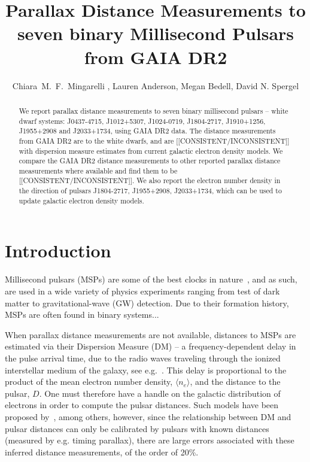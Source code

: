 \documentclass[iop,apj]{emulateapj}
\begin{document}
\title{Parallax Distance Measurements to seven binary Millisecond Pulsars from GAIA DR2}
 
\author{
Chiara~M.~F.~Mingarelli , 
Lauren Anderson,
Megan Bedell,
David N. Spergel
}



\begin{abstract}
We report parallax distance measurements to seven binary millisecond pulsars -- white dwarf systems: J0437-4715, J1012+5307, J1024-0719, J1804-2717, J1910+1256, J1955+2908 and J2033+1734, using GAIA DR2 data. The distance measurements from GAIA DR2 are to the white dwarfs, and are [[CONSISTENT/INCONSISTENT]] with dispersion measure estimates from current galactic electron density models. We compare the GAIA DR2 distance measurements to other reported parallax distance measurements where available and find them to be [[CONSISTENT/INCONSISTENT]]. We also report the electron number density in the direction of pulsars J1804-2717, J1955+2908, J2033+1734, which can be used to update galactic electron density models.
\end{abstract}


\section{Introduction}
\label{sec:intro}
Millisecond pulsars (MSPs) are some of the best clocks in nature~\citep{bkh+82}, and as such, are used in a wide variety of physics experiments ranging from test of dark matter to gravitational-wave (GW) detection. Due to their formation history, MSPs are often found in binary systems...

When parallax distance measurements are not available, distances to MSPs are estimated via their Dispersion Measure (DM) -- a frequency-dependent delay in the pulse arrival time, due to the radio waves traveling through the ionized interstellar medium of the galaxy, see e.g.~\citep{pulsarAstronomy}. This delay is proportional to the product of the mean electron number density, $\langle n_e \rangle$, and the distance to the pulsar, $D$. One must therefore have a handle on the galactic distribution of electrons in order to compute the pulsar distances. Such models have been proposed by~\cite{cl02,cl03, ymw+17}, among others, however, since the relationship between DM and pulsar distances can only be calibrated by pulsars with known distances (measured by e.g. timing parallax), there are large errors associated with these inferred distance measurements, of the order of 20\%.
\end{document}
